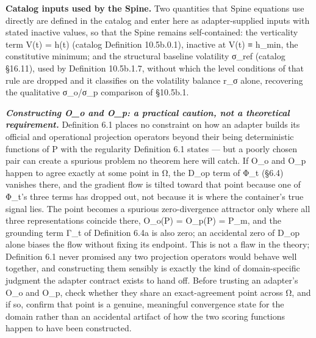 \documentclass[
]{article}
\begin{document}
\textbf{Catalog inputs used by the Spine.} Two quantities that Spine
equations use directly are defined in the catalog and enter here as
adapter-supplied inputs with stated inactive values, so that the Spine
remains self-contained: the verticality term V(t) = h(t) (catalog
Definition 10.5b.0.1), inactive at V(t) ≡ h\_min, the constitutive
minimum; and the structural baseline volatility σ\_ref (catalog §16.11),
used by Definition 10.5b.1.7, without which the level conditions of that
rule are dropped and it classifies on the volatility balance r\_σ alone,
recovering the qualitative σ\_o/σ\_p comparison of §10.5b.1.

\emph{\textbf{Constructing O\_o and O\_p: a practical caution, not a
theoretical requirement.}} Definition 6.1 places no constraint on how an
adapter builds its official and operational projection operators beyond
their being deterministic functions of P with the regularity Definition
6.1 states --- but a poorly chosen pair can create a spurious problem no
theorem here will catch. If O\_o and O\_p happen to agree exactly at
some point in Ω, the D\_op term of Φ\_t (§6.4) vanishes there, and the
gradient flow is tilted toward that point because one of Φ\_t's three
terms has dropped out, not because it is where the container's true
signal lies. The point becomes a spurious zero-divergence attractor only
where all three representations coincide there, O\_o(P) = O\_p(P) =
P\_m, and the grounding term Γ\_t of Definition 6.4a is also zero; an
accidental zero of D\_op alone biases the flow without fixing its
endpoint. This is not a flaw in the theory; Definition 6.1 never
promised any two projection operators would behave well together, and
constructing them sensibly is exactly the kind of domain-specific
judgment the adapter contract exists to hand off. Before trusting an
adapter's O\_o and O\_p, check whether they share an exact-agreement
point across Ω, and if so, confirm that point is a genuine, meaningful
convergence state for the domain rather than an accidental artifact of
how the two scoring functions happen to have been constructed.
\end{document}
